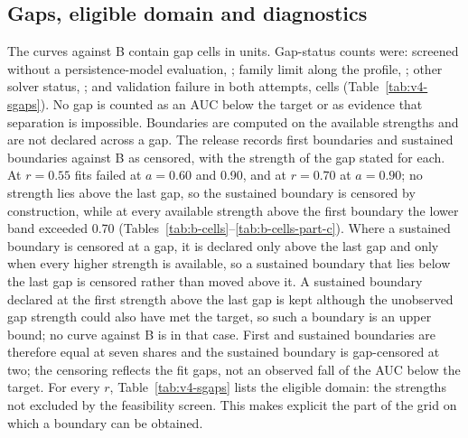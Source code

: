 



\subsection{Gaps, eligible domain and diagnostics}\label{sec:additional-diagnostics}

The curves against B contain  gap cells in  units. Gap-status counts were: screened without a persistence-model evaluation, ; family limit along the profile, ; other solver status, ; and validation failure in both attempts,  cells (Table~\ref{tab:v4-sgaps}). No gap is counted as an AUC below the target or as evidence that separation is impossible.
Boundaries are computed on the available strengths and are not declared across a gap. The release records  first boundaries and  sustained boundaries against B as censored, with the strength of the gap stated for each. At $r=0.55$ fits failed at $a=0.60$ and 0.90, and at $r=0.70$ at $a=0.90$; no strength lies above the last gap, so the sustained boundary is censored by construction, while at every available strength above the first boundary the lower band exceeded 0.70 (Tables~\ref{tab:b-cells}--\ref{tab:b-cells-part-c}). Where a sustained boundary is censored at a gap, it is declared only above the last gap and only when every higher strength is available, so a sustained boundary that lies below the last gap is censored rather than moved above it. A sustained boundary declared at the first strength above the last gap is kept although the unobserved gap strength could also have met the target, so such a boundary is an upper bound; no curve against B is in that case. First and sustained boundaries are therefore equal at seven shares and the sustained boundary is gap-censored at two; the censoring reflects the fit gaps, not an observed fall of the AUC below the target.
For every $r$, Table~\ref{tab:v4-sgaps} lists the eligible domain: the strengths not excluded by the feasibility screen. This makes explicit the part of the grid on which a boundary can be obtained.

